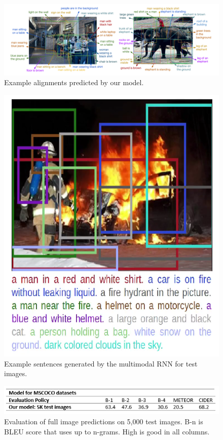 \documentclass[12pt]{article}%
\begin{document}
\begin{figure}[t]
\begin{center}
   \includegraphics[width=0.8\linewidth]{j22.jpg}
\end{center}
   \caption{Example alignments predicted by our model.}
\label{fig:circle}
\end{figure}


\begin{figure}[t]
\begin{center}
   \includegraphics[width=0.8\linewidth]{j23.jpg}
\end{center}
   \caption{Example sentences generated by the multimodal RNN for test images.}
\label{fig:circle}
\end{figure}

\begin{figure}[t]
\begin{center}
   \includegraphics[width=0.8\linewidth]{61.png}
\end{center}
   \caption{Evaluation of full image predictions on 5,000 test images. B-n is BLEU score that uses up to n-grams. High is good in all columns. }
\label{fig:circle}
\end{figure}
\end{document}
